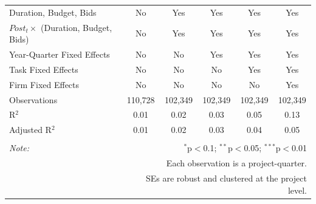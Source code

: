 \documentclass[
]{article}
\begin{document}
\begin{table}[H]
\begin{tabular}{@{\extracolsep{-2pt}}lccccc}
Duration, Budget, Bids & No & Yes & Yes & Yes & Yes \\ 
$Post_t \times $  (Duration, Budget, Bids) & No & Yes & Yes & Yes & Yes \\ 
Year-Quarter Fixed Effects & No & No & Yes & Yes & Yes \\ 
Task Fixed Effects & No & No & No & Yes & Yes \\ 
Firm Fixed Effects & No & No & No & No & Yes \\ 
Observations & 110,728 & 102,349 & 102,349 & 102,349 & 102,349 \\ 
R$^{2}$ & 0.01 & 0.02 & 0.03 & 0.05 & 0.13 \\ 
Adjusted R$^{2}$ & 0.01 & 0.02 & 0.03 & 0.04 & 0.05 \\ 
\hline 
\hline \\[-1.8ex] 
\textit{Note:}  & \multicolumn{5}{r}{$^{*}$p$<$0.1; $^{**}$p$<$0.05; $^{***}$p$<$0.01} \\ 
 & \multicolumn{5}{r}{Each observation is a project-quarter.} \\ 
 & \multicolumn{5}{r}{SEs are robust and clustered at the project level.} \\ 
\end{tabular} 
\end{table}
\end{document}
